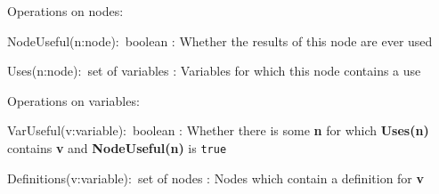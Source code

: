 Operations on nodes:
\begin{tightdesc}
\item[NodeUseful(n:node):~boolean]
:	Whether the results of this node are ever used
\item[Uses(n:node):~set of variables]
:	Variables for which this node contains a use
\end{tightdesc}

Operations on variables:
\begin{tightdesc}
\item[VarUseful(v:variable):~boolean]
:	Whether there is some \textbf{n} for which 
        \textbf{Uses(n)} contains \textbf{v} and
        \textbf{NodeUseful(n)} is \texttt{true}
\item[Definitions(v:variable):~set of nodes]
:	Nodes which contain a definition for \textbf{v}
\end{tightdesc}
